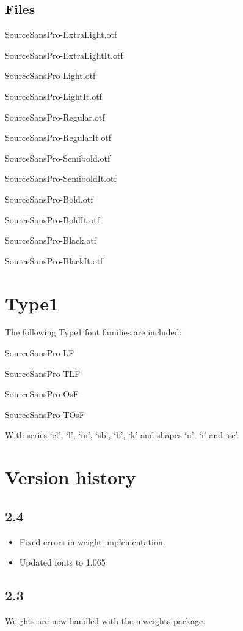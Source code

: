 \documentclass[11pt,a4paper,english]{article}
\begin{document}
\begin{multicols}{2}
\subsection{Files}
\begin{itemize*}
	\item SourceSansPro-ExtraLight.otf
	\item SourceSansPro-ExtraLightIt.otf
	\item SourceSansPro-Light.otf
	\item SourceSansPro-LightIt.otf
	\item SourceSansPro-Regular.otf
	\item SourceSansPro-RegularIt.otf
	\item SourceSansPro-Semibold.otf
	\item SourceSansPro-SemiboldIt.otf
	\item SourceSansPro-Bold.otf
	\item SourceSansPro-BoldIt.otf
	\item SourceSansPro-Black.otf
	\item SourceSansPro-BlackIt.otf
\end{itemize*}

\section{Type1}
The following Type1 font families are included:
\begin{itemize*}
	\item SourceSansPro-LF
	\item SourceSansPro-TLF
	\item SourceSansPro-OsF
	\item SourceSansPro-TOsF
\end{itemize*}
With series ‘el’, ‘l’, ‘m’, ‘sb’, ‘b’, ‘k’ and shapes ‘n’, ‘i’ and ‘sc’.

\section{Version history}
\subsection*{2.4}
\begin{itemize}
	\item Fixed errors in weight implementation.
	\item Updated fonts to 1.065
\end{itemize}

\subsection*{2.3}
\begin{itemize*}
	\item Weights are now handled with the \href{http://www.ctan.org/pkg/mweights}{mweights} package.
\end{itemize*}


\end{multicols}
\end{document}
